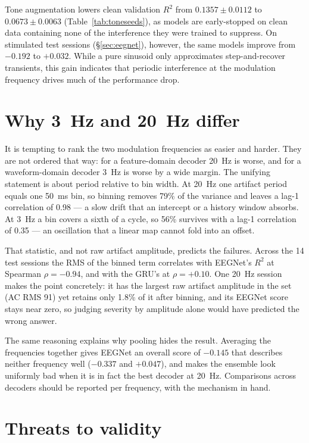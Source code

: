 \documentclass[11pt]{article}
\newcommand{\Rtwo}{R^{2}}
\begin{document}
Tone augmentation lowers clean validation $R^2$ from $0.1357 \pm 0.0112$ to $0.0673 \pm 0.0063$ (Table~\ref{tab:toneseeds}), as models are early-stopped on clean data containing none of the interference they were trained to suppress. On stimulated test sessions (\S\ref{sec:eegnet}), however, the same models improve from $-0.192$ to $+0.032$. While a pure sinusoid only approximates step-and-recover transients, this gain indicates that periodic interference at the modulation frequency drives much of the performance drop.


\section{Why 3~Hz and 20~Hz differ}
\label{app:mechanism}

It is tempting to rank the two modulation frequencies as easier and harder. They are not
ordered that way: for a feature-domain decoder 20~Hz is worse, and for a waveform-domain
decoder 3~Hz is worse by a wide margin. The unifying statement is about period relative to bin
width. At 20~Hz one artifact period equals one 50~ms bin, so binning removes 79\% of the
variance and leaves a lag-1 correlation of 0.98 --- a slow drift that an intercept or a
history window absorbs. At 3~Hz a bin covers a sixth of a cycle, so 56\% survives with a lag-1
correlation of 0.35 --- an oscillation that a linear map cannot fold into an offset.

That statistic, and not raw artifact amplitude, predicts the failures. Across the 14 test
sessions the RMS of the binned term correlates with EEGNet's $\Rtwo$ at Spearman
$\rho=-0.94$, and with the GRU's at $\rho=+0.10$. One 20~Hz session makes the point concretely:
it has the largest raw artifact amplitude in the set (AC RMS 91) yet retains only 1.8\% of it
after binning, and its EEGNet score stays near zero, so judging severity by amplitude alone
would have predicted the wrong answer.

The same reasoning explains why pooling hides the result. Averaging the frequencies together
gives EEGNet an overall score of $-0.145$ that describes neither frequency well ($-0.337$ and
$+0.047$), and makes the ensemble look uniformly bad when it is in fact the best decoder at
20~Hz. Comparisons across decoders should be reported per frequency, with the mechanism in
hand.

\section{Threats to validity}
\label{app:threats}
\end{document}

